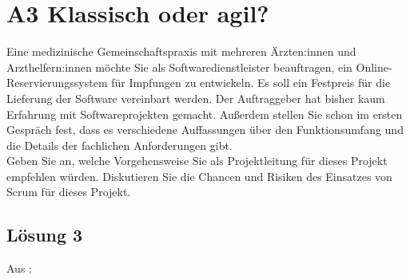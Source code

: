\documentclass[main.tex]{subfiles}
\begin{document}
\section{A3 Klassisch oder agil?}

Eine medizinische Gemeinschaftspraxis mit mehreren Ärzten:innen und Arzthelfern:innen
möchte Sie als Softwaredienstleister beauftragen, ein Online-Reservierungssystem für Impfungen zu entwickeln. Es soll ein Festpreis für die Lieferung der Software vereinbart werden. Der
Auftraggeber hat bisher kaum Erfahrung mit Softwareprojekten gemacht. Außerdem stellen Sie
schon im ersten Gespräch fest, dass es verschiedene Auffassungen über den Funktionsumfang
und die Details der fachlichen Anforderungen gibt.\\

Geben Sie an, welche Vorgehensweise Sie als Projektleitung für dieses Projekt empfehlen würden.
Diskutieren Sie die Chancen und Risiken des Einsatzes von Scrum für dieses Projekt.

\subsection{Lösung 3}
Aus \cite{openai2023chatgpt4}:

\end{document}
